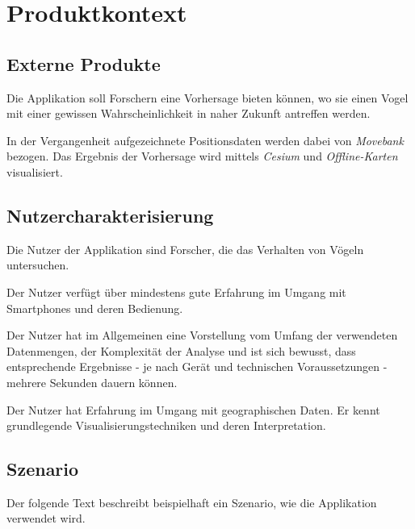 \documentclass[12pt]{article} %
\begin{document}

\newpage
\section{Produktkontext} \label{kontext}

\subsection{Externe Produkte}
Die Applikation soll Forschern eine Vorhersage bieten können, wo sie einen Vogel mit einer gewissen Wahrscheinlichkeit in naher Zukunft antreffen werden. 

In der Vergangenheit aufgezeichnete Positionsdaten werden dabei von \textit{Movebank} bezogen. Das Ergebnis der Vorhersage wird mittels \textit{Cesium} und \textit{Offline-Karten} visualisiert.


\subsection{Nutzercharakterisierung}

Die Nutzer der Applikation sind Forscher, die das Verhalten von Vögeln untersuchen.

Der Nutzer verfügt über mindestens gute Erfahrung im Umgang mit Smartphones und deren Bedienung.

Der Nutzer hat im Allgemeinen eine Vorstellung vom Umfang der verwendeten Datenmengen, der Komplexität der Analyse und ist sich bewusst, dass entsprechende Ergebnisse - je nach Gerät und technischen Voraussetzungen - mehrere Sekunden dauern können.

Der Nutzer hat Erfahrung im Umgang mit geographischen Daten. Er kennt grundlegende Visualisierungstechniken und deren Interpretation. 


\subsection{Szenario}

Der folgende Text beschreibt beispielhaft ein Szenario, wie die Applikation verwendet wird.
\end{document}
